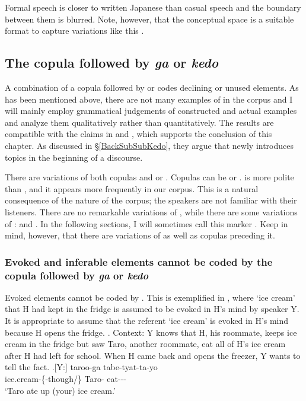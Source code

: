 Formal speech is closer to written Japanese than casual speech
and the boundary between them is blurred.
Note, however, that
the conceptual space is a suitable format to capture variations like this \cite[see][]{croft10}.

\subsection{The copula followed by \textit{ga} or \textit{kedo}}\label{kedo}

A combination of a copula followed by  or 
codes declining or unused elements.
As has been mentioned above,
there are not many examples of  in the corpus
and I will mainly employ grammatical judgements of constructed and actual examples
and analyze them qualitatively rather than quantitatively.
The results are compatible with the claims in  and ,
which supports the conclusion of this chapter.
As discussed in \S \ref{BackSubSubKedo},
they argue that  newly introduces topics in the beginning of a discourse.

There are variations of both copulas and  or .
Copulas can be  or .
 is more polite than ,
and it appears more frequently in our corpus.
This is a natural consequence of the nature of the corpus;
the speakers are not familiar with their listeners.
There are no remarkable variations of ,
while there are some variations of :
 and .
In the following sections,
I will sometimes call this marker .
Keep in mind, however, that there are variations of  as well as copulas preceding it.

\subsubsection{Evoked and inferable elements cannot be coded by the copula followed by \textit{ga} or \textit{kedo}}

Evoked elements cannot be coded by .
This is exemplified in \Next,
where `ice cream' that H had kept in the fridge is assumed to be evoked in H's mind by speaker Y.
It is appropriate to assume that the referent `ice cream' is evoked in H's mind
because H opens the fridge.
%
\ex. Context: Y knows that H, his roommate, keeps ice cream in the fridge
	but saw Taro, another roommate, eat all of H's ice cream after H had left for school.
	When H came back and opens the freezer,
	Y wants to tell the fact.
	\ag.[Y:]  taroo-ga tabe-tyat-ta-yo \\
		ice.cream-\{-though/\} Taro- eat--- \\
		`Taro ate up (your) ice cream.'

